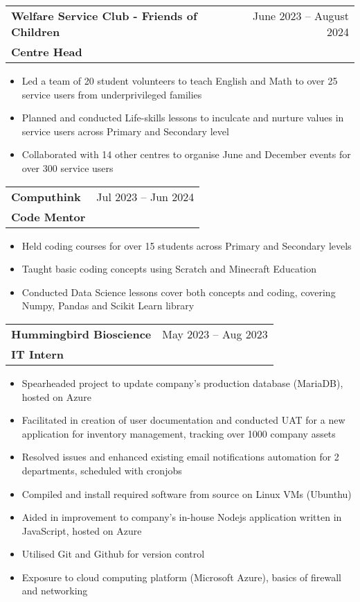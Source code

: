 \documentclass[letterpaper,11pt]{article}
\makeatletter
\newcommand{\resumeItem}[1]{
  \item\small{
    {#1 \vspace{-2pt}}
  }
}
\newcommand{\resumeSubheading}[4]{
  \vspace{-2pt}\item
    \begin{tabular*}{0.97\textwidth}[t]{l@{\extracolsep{\fill}}r}
      \textbf{#1} & #2 \\
      \textbf{#3} & \textit{\small #4} \\
    \end{tabular*}\vspace{-7pt}
}
\newcommand{\resumeSubSubheading}[2]{
    \item
    \begin{tabular*}{0.97\textwidth}{l@{\extracolsep{\fill}}r}
      \textit{\small#1} & \textit{\small #2} \\
    \end{tabular*}\vspace{-7pt}
}
\newcommand{\resumeSubHeadingListEnd}{\end{itemize}}
\newcommand{\resumeItemListStart}{\begin{itemize}}
\newcommand{\resumeItemListEnd}{\end{itemize}\vspace{-5pt}}
\makeatother
\begin{document}
      \resumeSubheading
      {Welfare Service Club - Friends of Children}{June 2023 -- August 2024}
          {Centre Head}{}
          \resumeItemListStart
            \resumeItem{Led a team of 20 student volunteers to teach English and Math to over 25 service users from underprivileged families}
            \resumeItem{Planned and conducted Life-skills lessons to inculcate and nurture values in service users across Primary and Secondary level}
            \resumeItem{Collaborated with 14 other centres to organise June and December events for over 300 service users}
        \resumeItemListEnd

    \resumeSubheading
      {Computhink}{Jul 2023 -- Jun 2024}
      {Code Mentor}{}
      \resumeItemListStart
        \resumeItem{Held coding courses for over 15 students across Primary and Secondary levels}
        \resumeItem{Taught basic coding concepts using Scratch and Minecraft Education}
        \resumeItem{Conducted Data Science lessons cover both concepts and coding, covering Numpy, Pandas and Scikit Learn library}
    \resumeItemListEnd

    \resumeSubheading
      {Hummingbird Bioscience}{May 2023 -- Aug 2023}
      {IT Intern}{}
      \resumeItemListStart
        \resumeItem{Spearheaded project to update company's production database (MariaDB), hosted on Azure}
        \resumeItem{Facilitated in creation of user documentation and conducted UAT for a new application for inventory management, tracking over 1000 company assets}
        \resumeItem{Resolved issues and enhanced existing email notifications automation for 2 departments, scheduled with cronjobs}
        \resumeItem{Compiled and install required software from source on Linux VMs (Ubunthu)}
        \resumeItem{Aided in improvement to company's in-house Nodejs application written in JavaScript, hosted on Azure}
        \resumeItem{Utilised Git and Github for version control}
        \resumeItem{Exposure to cloud computing platform (Microsoft Azure), basics of firewall and networking}
      \resumeItemListEnd


\end{document}
